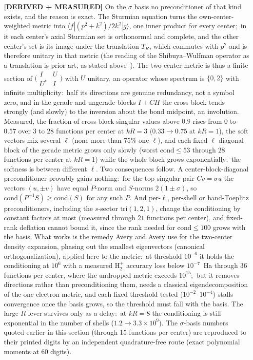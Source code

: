 \documentclass[aps,pra,twocolumn,superscriptaddress,longbibliography]{revtex4-2}
\begin{document}
\textbf{[DERIVED + MEASURED]} On the $\sigma$ basis no preconditioner of that
kind exists, and the reason is exact.  The Sturmian equation turns the
own-center-weighted metric into $\langle f|(p^2+k^2)/2k^2|g\rangle$, one inner
product for every center;\ in it each center's axial Sturmian set is orthonormal
and complete, and the other center's set is its image under the translation
$T_R$, which commutes with $p^2$ and is therefore unitary in that metric (the
reading of the Shibuya--Wulfman operator as a translation is prior art, as
stated above~\cite{shibuya1965}).  The two-center metric is thus a finite
section of $\bigl(\begin{smallmatrix}I&U\\U^\ast&I\end{smallmatrix}\bigr)$ with $U$
unitary, an operator whose spectrum is $\{0,2\}$ with infinite multiplicity:\
half its directions are genuine redundancy, not a symbol zero, and in the
gerade and ungerade blocks $I\pm C\Pi$ the cross block tends strongly (and
slowly) to the inversion about the bond midpoint, an involution.  Measured, the fraction of cross-block
singular values above $0.9$ rises from $0$ to $0.57$ over $3$ to $28$
functions per center at $kR=3$ ($0.33\to0.75$ at $kR=1$), the soft vectors mix
several $\ell$ (none more than $75\%$ one $\ell$), and each fixed-$\ell$ diagonal block of the gerade metric grows
only slowly (worst $\mathrm{cond}\le53$ through $28$ functions per center at
$kR=1$) while the whole block grows exponentially:\ the softness is between
different $\ell$.
Two consequences follow.  A center-block-diagonal preconditioner provably
gains nothing:\ for the top singular pair $Cv=\sigma u$ the vectors
$(u,\pm v)$ have equal $P$-norm and $S$-norms $2(1\pm\sigma)$, so
$\mathrm{cond}(P^{-1}S)\ge\mathrm{cond}(S)$ for any such $P$.  And per-$\ell$,
per-shell or band-Toeplitz preconditioners, including the $s$-sector
$\mathrm{tri}(1,2,1)$, change the conditioning by constant factors at most
(measured through $21$ functions per center),
and fixed-rank deflation cannot bound it, since the rank needed for
$\mathrm{cond}\le100$ grows with the basis.  What works is the remedy Avery and
Avery use for the two-center density expansion, phasing out the smallest
eigenvectors (canonical orthogonalization), applied here to the metric:\
at threshold $10^{-6}$ it holds the conditioning at $10^{6}$ with a measured
$\mathrm{H}_2^+$ accuracy loss below $10^{-7}$~Ha through $36$ functions per center, where the
undropped metric exceeds $10^{15}$;\ but it removes directions rather than
preconditioning them, needs a classical eigendecomposition of the one-electron
metric, and each fixed threshold tested ($10^{-2}$--$10^{-4}$) stalls convergence
once the basis grows, so the threshold must fall with the basis.  The large-$R$ lever survives only as a
delay:\ at $kR=8$ the conditioning is still exponential in the number of
shells ($1.2\to3.3\times10^{9}$).  The $\sigma$-basis numbers quoted earlier in
this section (through $15$ functions per center) are reproduced to their printed digits by an independent quadrature-free route
(exact polynomial moments at $60$ digits).
\end{document}
